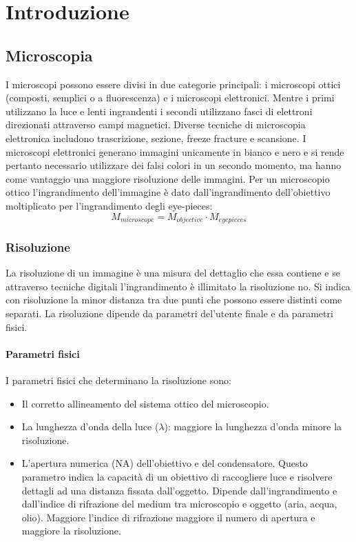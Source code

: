 \chapter{Introduzione}
\section{Microscopia}
I microscopi possono essere divisi in due categorie principali: i microscopi ottici (composti, semplici o a fluorescenza) e i microscopi elettronici. Mentre
i primi utilizzano la luce e lenti ingrandenti i secondi utilizzano fasci di elettroni direzionati attraverso campi magnetici. Diverse tecniche di 
microscopia elettronica includono trascrizione, sezione, freeze fracture e scansione. I microscopi elettronici generano immagini unicamente in bianco e nero
e si rende pertanto necessario utilizzare dei falsi colori in un secondo momento, ma hanno come vantaggio una maggiore risoluzione delle immagini. Per un
microscopio ottico l'ingrandimento dell'immagine \`e dato dall'ingrandimento dell'obiettivo moltiplicato per l'ingrandimento degli eye-pieces: 
$$M_{microscope} = M_{objective}\cdot M_{eyepieces}$$
\subsection{Risoluzione}
La risoluzione di un immagine \`e una misura del dettaglio che essa contiene e se attraverso tecniche digitali l'ingrandimento \`e illimitato la risoluzione
no. Si indica con risoluzione la minor distanza tra due punti che possono essere distinti come separati. La risoluzione dipende da parametri del'utente 
finale e da parametri fisici. 
\subsubsection{Parametri fisici}
I parametri fisici che determinano la risoluzione sono:
\begin{itemize}
\item Il corretto allineamento del sistema ottico del microscopio.
\item La lunghezza d'onda della luce ($\lambda$): maggiore la lunghezza d'onda minore la risoluzione.
\item L'apertura numerica (NA) dell'obiettivo e del condensatore. Questo parametro indica la capacit\`a di un obiettivo di raccogliere luce e risolvere 
dettagli ad una distanza fissata dall'oggetto. Dipende dall'ingrandimento e dall'indice di rifrazione del medium tra microscopio e oggetto (aria, acqua, 
olio). Maggiore l'indice di rifrazione maggiore il numero di apertura e maggiore la risoluzione.
\end{itemize}
